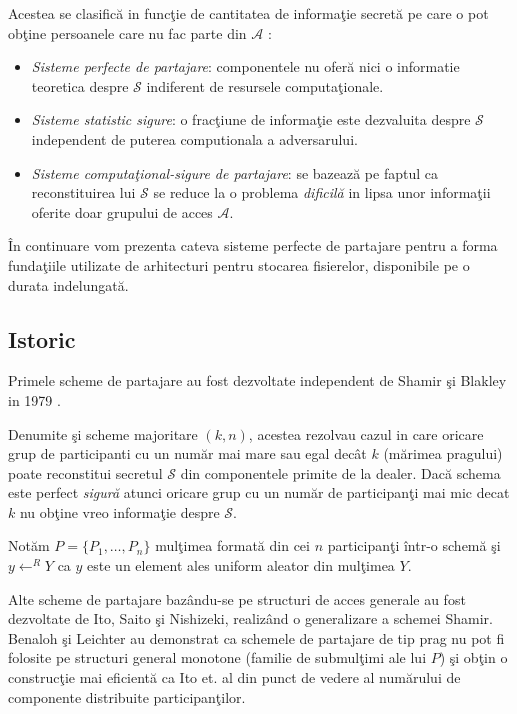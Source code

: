 \documentclass{llncs}
\newcommand{\todo}[1]{{\color{red}{TODO #1}}}
\begin{document}
Acestea se clasific\u{a} in func\c{t}ie de cantitatea de informa\c{t}ie secret\u{a} pe care o pot ob\c{t}ine persoanele care nu fac parte din $\mathcal{A}$ \cite{Martin:2008}:
\begin{itemize}
	\item \textit{Sisteme perfecte de partajare}: componentele nu ofer\u{a} nici o informatie teoretica despre $\mathcal{S}$ indiferent de resursele computa\c{t}ionale.
	\item \textit{Sisteme statistic sigure}: o frac\c{t}iune de informa\c{t}ie este dezvaluita despre $\mathcal{S}$ independent de puterea computionala a adversarului.
	\item \textit{Sisteme computa\c{t}ional-sigure de partajare}: se bazeaz\u{a} pe faptul ca reconstituirea lui $\mathcal{S}$ se reduce la o problema \textit{dificil\u{a}}\cite{boneh:1998decision} in lipsa unor informa\c{t}ii oferite doar grupului de acces $\mathcal{A}$.
\end{itemize} 

\^{I}n continuare vom prezenta cateva sisteme perfecte de partajare pentru a forma funda\c{t}iile utilizate de arhitecturi pentru stocarea fisierelor, disponibile pe o durata indelungat\u{a}.

\subsection{Istoric}

Primele scheme de partajare au fost dezvoltate independent de Shamir \c{s}i Blakley in 1979 \cite{B:1979, S:1979}.

Denumite \c{s}i scheme majoritare $(k, n)$, acestea rezolvau cazul in care oricare grup de participanti cu un num\u{a}r mai mare sau egal dec\^{a}t $k$  (m\u{a}rimea pragului) poate reconstitui secretul $\mathcal{S}$ din componentele primite de la dealer. Dac\u{a} schema este perfect \textit{sigur\u{a}} atunci oricare grup cu un num\u{a}r de participan\c{t}i mai mic decat $k$ nu ob\c{t}ine vreo informa\c{t}ie despre $\mathcal{S}$.

Not\u{a}m $P = \{P_1, \dots, P_n\}$ mul\c{t}imea format\u{a} din cei $n$ participan\c{t}i \^{i}ntr-o schem\u{a} \c{s}i $y \leftarrow^R Y$ ca $y$ este un element ales uniform aleator din mul\c{t}imea $Y$.

Alte scheme de partajare baz\^{a}ndu-se pe structuri de acces generale au fost dezvoltate de Ito, Saito \c{s}i Nishizeki, realiz\^{a}nd o generalizare a schemei Shamir. \cite{ITO:1989}
Benaloh \c{s}i Leichter au demonstrat ca schemele de partajare de tip prag nu pot fi folosite pe structuri general monotone (familie de submul\c{t}imi ale lui $P$) \c{s}i ob\c{t}in o construc\c{t}ie mai eficient\u{a} ca Ito et. al \cite{ITO:1989} din punct de vedere al num\u{a}rului de componente distribuite participan\c{t}ilor. \cite{JJ:1990}
\end{document}

